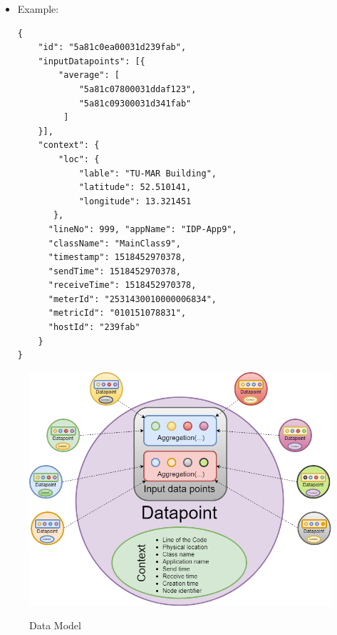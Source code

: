 \begin{itemize}
\begin{itemize}			
			\item Example: 
\begin{lstlisting}			
{
    "id": "5a81c0ea00031d239fab",
    "inputDatapoints": [{ 
        "average": [ 
            "5a81c07800031ddaf123",
            "5a81c09300031d341fab"
         ]
    }],
    "context": {
        "loc": {
            "lable": "TU-MAR Building", 
            "latitude": 52.510141,
            "longitude": 13.321451
       },
      "lineNo": 999, "appName": "IDP-App9",
      "className": "MainClass9",
      "timestamp": 1518452970378,
      "sendTime": 1518452970378,
      "receiveTime": 1518452970378,
      "meterId": "2531430010000006834", 
      "metricId": "010151078831",
      "hostId": "239fab"
    } 
}		
\end{lstlisting}

	\end{itemize}
\begin{figure}[h]
\centering
\includegraphics[width=\linewidth]{figures/dataModelforIDP.png}\\
\caption{Data Model}
\label{dataModel}
\end{figure}
\end{itemize}